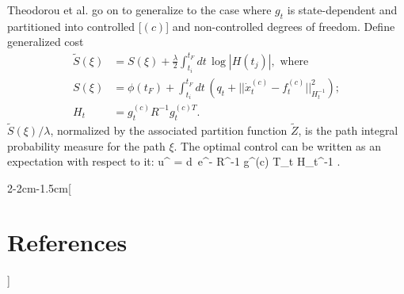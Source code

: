 \documentclass[notitlepage,openany,11pt]{report}
\DeclareMathOperator{\Tr}{Tr}
\numberwithin{equation}{section}
\theoremstyle{plain}%
\begin{document}
Theodorou et al. go on to generalize to the case where $g_{t}$ is state-dependent and partitioned into controlled [$(c)$] and non-controlled degrees of freedom. Define generalized cost
\begin{align*}
\widetilde{S}(\xi) &= S(\xi) + \frac{\lambda}{2} \int_{t_i}^{t_{F}} \! dt \, \log |H(t_{j})|, \text{ where} \\
S(\xi) &= \phi(t_{F}) + \int_{t_i}^{t_{F}} \! dt \, \left( q_{t} + || \dot{x}^{(c)}_{t} - f^{(c)}_{t} ||^{2}_{H_{t}^{-1}} \right); \\
H_{t} &= g^{(c)}_{t} R^{-1}g^{(c) T}_{t}.
\end{align*}
$\widetilde{S}(\xi)/\lambda$, normalized by the associated partition function $\widetilde{Z}$, is the path integral probability measure for the path $\xi$.  The optimal control can be written as an expectation with respect to it: 
\be
u^{\ast} =  \int \! d\xi \, e^{-} R^{-1} g^{(c) T}_{t} H_{t}^{-1} \left[ g^{(c)}_{t} dw_{t} - \frac{\lambda}{2} H_{t} \Tr \, (H_{t}^{-1} \partial_{x} H_{t}) \right].
\ee 



\clearpage
{} %

\let\oldthebibliography=\thebibliography
\let\endoldthebibliography=\endthebibliography
\renewenvironment{thebibliography}[1]{%
    \begin{oldthebibliography}{#1}%
    \setlength{\parskip}{3pt plus 2pt minus 1pt}%
    \setlength{\itemsep}{3pt}%
}%
{%
    \end{oldthebibliography}%
}

\begin{adjmulticols*}{2}{-2cm}{-1.5cm}[\section*{References}] %

\noindent
\footnotesize %
\begin{flushleft}


\end{flushleft}
\normalsize

\end{adjmulticols*}
\end{document}
